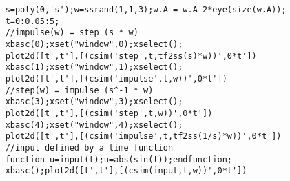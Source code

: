 \begin{examples}
  \begin{Verbatim}
    s=poly(0,'s');w=ssrand(1,1,3);w.A = w.A-2*eye(size(w.A));
    t=0:0.05:5;
    //impulse(w) = step (s * w)
    xbasc(0);xset("window",0);xselect();
    plot2d([t',t'],[(csim('step',t,tf2ss(s)*w))',0*t'])
    xbasc(1);xset("window",1);xselect();
    plot2d([t',t'],[(csim('impulse',t,w))',0*t'])
    //step(w) = impulse (s^-1 * w)
    xbasc(3);xset("window",3);xselect();
    plot2d([t',t'],[(csim('step',t,w))',0*t'])
    xbasc(4);xset("window",4);xselect();
    plot2d([t',t'],[(csim('impulse',t,tf2ss(1/s)*w))',0*t'])
    //input defined by a time function
    function u=input(t);u=abs(sin(t));endfunction;
    xbasc();plot2d([t',t'],[(csim(input,t,w))',0*t'])
  \end{Verbatim}
\end{examples}
\begin{manseealso}
          
\end{manseealso}
